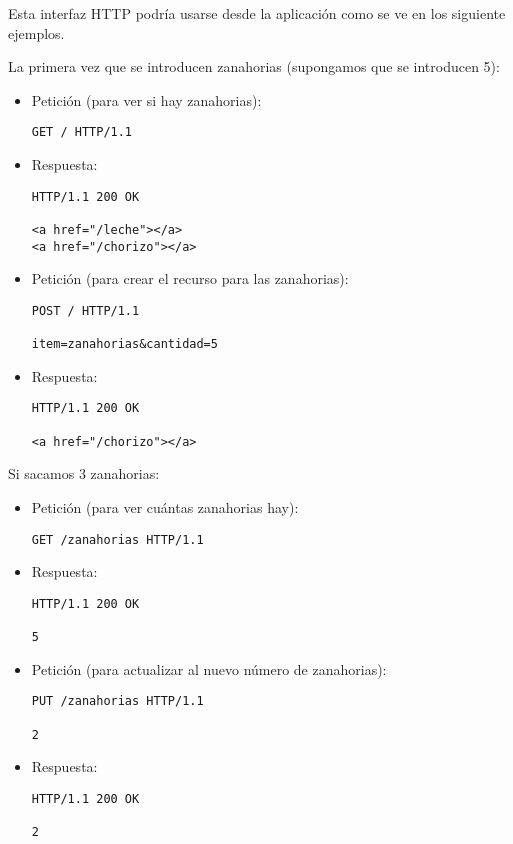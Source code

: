 Esta interfaz HTTP podría usarse desde la aplicación como se ve en los siguiente ejemplos.

La primera vez que se introducen zanahorias (supongamos que se introducen 5):

\begin{itemize}
\item Petición (para ver si hay zanahorias):
\begin{verbatim}
GET / HTTP/1.1
\end{verbatim}

\item Respuesta:
\begin{verbatim}
HTTP/1.1 200 OK

<a href="/leche"></a>
<a href="/chorizo"></a>
\end{verbatim}

\item Petición (para crear el recurso para las zanahorias):
\begin{verbatim}
POST / HTTP/1.1

item=zanahorias&cantidad=5
\end{verbatim}

\item Respuesta:
\begin{verbatim}
HTTP/1.1 200 OK

<a href="/chorizo"></a>
\end{verbatim}

\end{itemize}

Si sacamos 3 zanahorias:

\begin{itemize}
\item Petición (para ver cuántas zanahorias hay):
\begin{verbatim}
GET /zanahorias HTTP/1.1
\end{verbatim}

\item Respuesta:
\begin{verbatim}
HTTP/1.1 200 OK

5
\end{verbatim}

\item Petición (para actualizar al nuevo número de zanahorias):
\begin{verbatim}
PUT /zanahorias HTTP/1.1

2
\end{verbatim}

\item Respuesta:
\begin{verbatim}
HTTP/1.1 200 OK

2
\end{verbatim}

\end{itemize}

